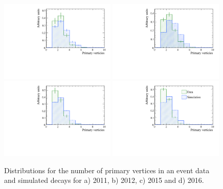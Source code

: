 \begin{figure}[tbp]
  \centering
    \includegraphics[width=0.49\textwidth]{./Figs/LifetimeSystematics/2011_nPVs.pdf}
    \includegraphics[width=0.49\textwidth]{./Figs/LifetimeSystematics/2012_nPVs.pdf}
    \includegraphics[width=0.49\textwidth]{./Figs/LifetimeSystematics/2015_nPVs.pdf}
    \includegraphics[width=0.49\textwidth]{./Figs/LifetimeSystematics/2016_nPVs.pdf}
  \caption{Distributions for the number of primary vertices in an event \bdkpi data and simulated decays for a) 2011, b) 2012, c) 2015 and d) 2016.}%
  \label{fig:Bd2KPi_nPVs_MC_data_comparison}
\end{figure}


